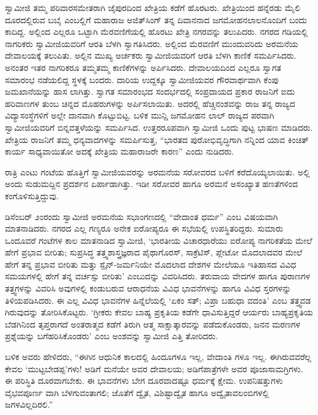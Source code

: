 ಸ್ವಾಮೀಜಿ ತಮ್ಮ ಪರಿವಾರಸಮೇತರಾಗಿ ಜೈಪುರದಿಂದ ಖೇತ್ರಿಯ ಕಡೆಗೆ ಹೊರಟರು. ಖೇತ್ರಿಯಿಂದ ಹನ್ನೆರಡು ಮೈಲಿ ದೂರದಲ್ಲಿರುವ ಬಬೈ ಎಂಬಲ್ಲಿಗೆ ಮಹಾರಾಜ ಅಜಿತ್​ಸಿಂಗ್ ತನ್ನ ದಿವಾನನಾದ ಜಗಮೋಹನಲಾಲನೊಂದಿಗೆ ಬಂದು ಕಾದಿದ್ದ. ಅಲ್ಲಿಂದ ಎಲ್ಲರೂ ಒಟ್ಟಾಗಿ ಮೆರವಣಿಗೆಯಲ್ಲಿ ಹೊರಟು ಖೇತ್ರಿ ನಗರವನ್ನು ತಲುಪಿದರು. ನಗರದ ಗಡಿಯಲ್ಲಿ ನಾಗರಿಕರು ಸ್ವಾಮೀಜಿಯವರಿಗೆ ಆರತಿ ಬೆಳಗಿ ಸ್ವಾಗತಿಸಿದರು. ಅಲ್ಲಿಂದ ಮೆರವಣಿಗೆ ಮುಂದುವರಿದು ಅರಮನೆಯ ದೇವಾಲಯಕ್ಕೆ ತಲುಪಿತು. ಅಲ್ಲಿನ ಮುಖ್ಯ ಅರ್ಚಕರು ಸ್ವಾಮೀಜಿಯವರಿಗೆ ಆರತಿ ಬೆಳಗಿ ಕಾಣಿಕೆ ಸಮರ್ಪಿಸಿದರು. ಅನಂತರ ಇತರ ನಾಗರಿಕರೂ ತಮ್ಮತಮ್ಮ ಕಾಣಿಕೆಗಳನ್ನು ಅರ್ಪಿಸಿದರು. ದೇವಾಲಯದಿಂದ ಎಲ್ಲರೂ ಸ್ವಾಗತ ಸಮಾರಂಭ ನಡೆಯಲಿದ್ದ ಸ್ಥಳಕ್ಕೆ ಬಂದರು. ದಾರಿಯ ಉದ್ದಕ್ಕೂ ಸ್ವಾಮೀಜಿಯವರ ಗೌರವಾರ್ಥವಾಗಿ ಕೆಂಪು ಜಮಖಾನೆಯನ್ನು ಹಾಸ ಲಾಗಿತ್ತು. ಸ್ವಾಗತ ಸಮಾರಂಭದ ಸಂದರ್ಭದಲ್ಲಿ ಸಂಪ್ರದಾಯದ ಪ್ರಕಾರ ರಾಜನಿಗೆ ಐದು ಹರಿವಾಣಗಳ ತುಂಬ ಚಿನ್ನದ ಮೊಹರುಗಳನ್ನು ಅರ್ಪಿಸಲಾಯಿತು. ಅದರಲ್ಲಿ ಹೆಚ್ಚಿನಂಶವನ್ನು ರಾಜ ತನ್ನ ರಾಜ್ಯದ ವಿದ್ಯಾಸಂಸ್ಥೆಗಳಿಗೆ ಅಲ್ಲೇ ದಾನವಾಗಿ ಕೊಟ್ಟುಬಿಟ್ಟ. ಬಳಿಕ ಮುನ್ಷಿ ಜಗಮೋಹನ ಲಾಲ್ ರಾಜ್ಯದ ಪರವಾಗಿ ಸ್ವಾಮೀಜಿಯವರಿಗೆ ಬಿನ್ನವತ್ತಳೆಯನ್ನು ಸಮರ್ಪಿಸಿದ. ಉತ್ತರರೂಪವಾಗಿ ಸ್ವಾಮೀಜಿ ಒಂದು ಪುಟ್ಟ ಭಾಷಣ ಮಾಡಿದರು. ಖೇತ್ರಿಯ ರಾಜನಿಗೆ ತಮ್ಮ ಧನ್ಯವಾದಗಳನ್ನು ಸಮರ್ಪಿಸುತ್ತ, “ಭಾರತದ ಪುರೋಭಿವೃದ್ಧಿಗಾಗಿ ನನ್ನಿಂದ ಯಾವ ಕಿಂಚಿತ್ ಕಾರ್ಯ ಸಾಧ್ಯವಾಯಿತೋ ಅದಕ್ಕೆ ಖೇತ್ರಿಯ ಮಹಾರಾಜರೇ ಕಾರಣ” ಎಂದು ನುಡಿದರು.

ರಾತ್ರಿ ಎಂಟು ಗಂಟೆಯ ಹೊತ್ತಿಗೆ ಸ್ವಾಮೀಜಿಯವರನ್ನು ಅರಮನೆಯ ಸರೋವರದ ಬಳಿಗೆ ಕರೆದೊಯ್ಯಲಾಯಿತು. ಅಲ್ಲಿ ಅಂದು ಸುಡುಮದ್ದಿನ ಪ್ರದರ್ಶನ ಏರ್ಪಾಡಾಗಿತ್ತು. ಇಡೀ ಸರೋವರ ಹಾಗೂ ಅರಮನೆ ಅಸಂಖ್ಯಾತ ಹಣತೆಗಳಿಂದ ಕಂಗೊಳಿಸುತ್ತಿದ್ದುವು.

ಡಿಸೆಂಬರ್ ೨ಂರಂದು ಸ್ವಾಮೀಜಿ ಅರಮನೆಯ ಸಭಾಂಗಣದಲ್ಲಿ “ವೇದಾಂತ ಧರ್ಮ” ಎಂಬ ವಿಷಯವಾಗಿ ಮಾತನಾಡಿದರು. ನಗರದ ಎಲ್ಲ ಗಣ್ಯರೂ ಅನೇಕ ಐರೋಪ್ಯರೂ ಈ ಸಭೆಯಲ್ಲಿ ಉಪಸ್ಥಿತರಿದ್ದರು. ಸುಮಾರು ಒಂದೂವರೆ ಗಂಟೆಗಳ ಕಾಲ ಮಾತನಾಡಿದ ಸ್ವಾಮೀಜಿ, ‘ಭಾರತೀಯ ವಿಚಾರಧಾರೆಯು ಐರೋಪ್ಯ ನಾಗರಿಕತೆಯ ಮೇಲೆ ಹೇಗೆ ಪ್ರಭಾವ ಬೀರಿತು; ಸುಪ್ರಸಿದ್ಧ ತತ್ತ್ವಶಾಸ್ತ್ರಜ್ಞರಾದ ಪೈಥಾಗೊರಸ್, ಸಾಕ್ರೆಟಿಸ್, ಪ್ಲೇಟೋ ಮೊದಲಾದವರ ಮೇಲೆ ಹೇಗೆ ತನ್ನ ಪ್ರಭಾವ ಬೀರಿತು ಮತ್ತು ಸ್ಪೈನ್​-ಜರ್ಮನಿಯೇ ಮೊದಲಾದ ದೇಶಗಳ ಮೇಲೆಯೂ ಇತಿಹಾಸದ ವಿವಿಧ ಸಮಯಗಳಲ್ಲಿ ಹೇಗೆ ತನ್ನ ವರ್ಚಸ್ಸು ಬೀರಿತು’ ಎಂಬುದನ್ನು ವಿವರಿಸಿದರು. ತರುವಾಯ ವೇದಗಳ ಹಾಗೂ ಪುರಾಣಗಳ ತತ್ತ್ವಗಳನ್ನು ವಿವರಿಸಿ ಅವುಗಳಲ್ಲಿ ಕಂಡುಬರುವ ಆರಾಧನೆಯ ವಿವಿಧ ಭಾವನೆಗಳನ್ನು ಹಾಗೂ ವಿವಿಧ ಸ್ತರಗಳನ್ನು ತಿಳಿಯಪಡಿಸಿದರು. ಈ ಎಲ್ಲ ವಿವಿಧ ಭಾವನೆಗಳ ಹಿನ್ನೆಲೆಯಲ್ಲಿ ‘ಏಕಂ ಸತ್; ವಿಪ್ರಾ ಬಹುಧಾ ವದಂತಿ’ ಎಂಬ ತತ್ತ್ವವಡ ಗಿರುವುದನ್ನು ತೋರಿಸಿಕೊಟ್ಟರು. ‘ಗ್ರೀಕರು ಕೇವಲ ಬಾಹ್ಯ ಪ್ರಕೃತಿಯ ಕಡೆಗೇ ಧಾವಿಸುತ್ತಿದ್ದರೆ ಆರ್ಯರು ಬಾಹ್ಯಪ್ರಕೃತಿಯ ಬೆಡಗಿನಿಂದ ತೃಪ್ತರಾಗದೆ ಅಂತರಾತ್ಮದ ಕಡೆಗೆ ತಿರುಗಿ ಆತ್ಮ ಸಾಕ್ಷಾತ್ಕಾರವನ್ನು ಪಡೆದುಕೊಂಡರು, ಜನನ ಮರಣಗಳ ಪ್ರಶ್ನೆಯನ್ನು ಬಗೆಹರಿಸಿಕೊಂಡರು’ ಎಂಬ ಅಂಶವನ್ನು ಸ್ವಾಮೀಜಿ ಎತ್ತಿ ತೋರಿದರು.

ಬಳಿಕ ಅವರು ಹೇಳಿದರು, “ಈಗಿನ ಆಧುನಿಕ ಕಾಲದಲ್ಲಿ ಹಿಂದೂಗಳೂ ಇಲ್ಲ, ವೇದಾಂತಿ ಗಳೂ ಇಲ್ಲ. ಈಗಿರುವವರೆಲ್ಲ ಕೇವಲ ‘ಮುಟ್ಟಬೇಡಪ್ಪ’ಗಳು! ಅಡಿಗೆ ಮನೆಯೇ ಅವರ ದೇವಾಲಯ; ಅಡಿಗೆಪಾತ್ರೆಗಳೇ ಅವರ ಪೂಜಾಸಾಮಗ್ರಿಗಳು. ಈ ಪರಿಸ್ಥಿತಿ ದೂರವಾಗಬೇಕು. ಈ ಭಾವನೆಗಳು ಬೇಗ ದೂರವಾದಷ್ಟೂ ಧರ್ಮಕ್ಕೆ ಕ್ಷೇಮ. ಉಪನಿಷತ್ತುಗಳು ವೈಭವಪೂರ್ಣ ವಾಗಿ ಬೆಳಗುವಂತಾಗಲಿ; ಜೊತೆಗೆ ದ್ವೈತ, ವಿಶಿಷ್ಟಾದ್ವೈತ ಹಾಗೂ ಅದ್ವೈತಾವಲಂಬಿಗಳಲ್ಲಿ ಜಗಳವಿಲ್ಲದಿರಲಿ.”

